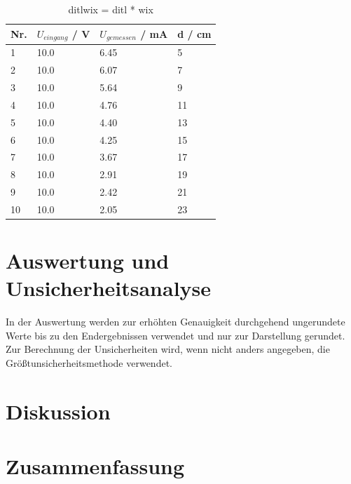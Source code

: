 \documentclass[12pt,a4paper,twoside]{article}
\begin{document}
\begin{table}[H]
    \centering
    \caption{ditlwix = ditl * wix}
    \label{tab:Messdaten 4.8 2}
    \begin{tabular}{| l | l | l | l |}
        \hline
        Nr. & $U_{eingang}$ / V & $U_{gemessen}$ / mA & d / cm \\
        \hline
        1  & 10.0  & 6.45 & 5 \\
        2  & 10.0  & 6.07 & 7 \\
        3  & 10.0  & 5.64 & 9 \\
        4  & 10.0  & 4.76 & 11 \\
        5  & 10.0  & 4.40 & 13 \\
        6  & 10.0  & 4.25 & 15 \\
        7  & 10.0  & 3.67 & 17 \\
        8  & 10.0  & 2.91 & 19 \\
        9  & 10.0  & 2.42 & 21 \\
        10 & 10.0  & 2.05 & 23 \\
        \hline  
    \end{tabular}
\end{table}

\section{Auswertung und Unsicherheitsanalyse} %

In der Auswertung werden zur erhöhten Genauigkeit durchgehend ungerundete Werte bis zu den Endergebnissen verwendet und nur zur Darstellung gerundet. \\
Zur Berechnung der Unsicherheiten wird, wenn nicht anders angegeben, die Größtunsicherheitsmethode verwendet.


\section{Diskussion} %


\section{Zusammenfassung} %


\printbibliography[heading=bibintoc]
\end{document}
